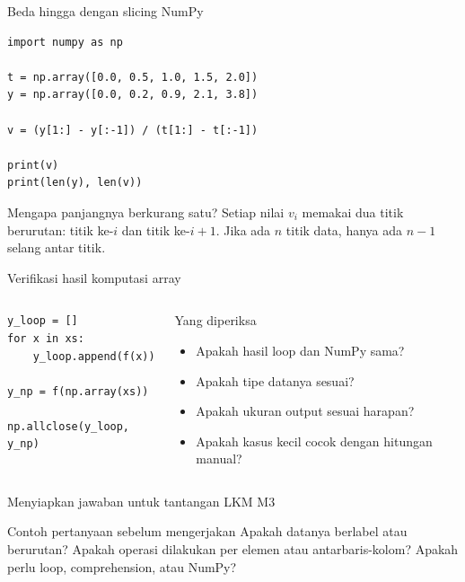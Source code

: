\documentclass[aspectratio=169,11pt]{beamer}
\begin{document}
\begin{frame}[fragile]{Beda hingga dengan slicing NumPy}
\begin{lstlisting}
import numpy as np

t = np.array([0.0, 0.5, 1.0, 1.5, 2.0])
y = np.array([0.0, 0.2, 0.9, 2.1, 3.8])

v = (y[1:] - y[:-1]) / (t[1:] - t[:-1])

print(v)
print(len(y), len(v))
\end{lstlisting}
\begin{block}{Mengapa panjangnya berkurang satu?}
Setiap nilai $v_i$ memakai dua titik berurutan: titik ke-$i$ dan titik ke-$i+1$. Jika ada $n$ titik data, hanya ada $n-1$ selang antar titik.
\end{block}
\end{frame}

\begin{frame}[fragile]{Verifikasi hasil komputasi array}
\begin{columns}[T]
\begin{lstlisting}
y_loop = []
for x in xs:
    y_loop.append(f(x))

y_np = f(np.array(xs))

np.allclose(y_loop, y_np)
\end{lstlisting}
\begin{block}{Yang diperiksa}
\begin{itemize}
  \item Apakah hasil loop dan NumPy sama?
  \item Apakah tipe datanya sesuai?
  \item Apakah ukuran output sesuai harapan?
  \item Apakah kasus kecil cocok dengan hitungan manual?
\end{itemize}
\end{block}
\end{columns}
\end{frame}

\begin{frame}{Menyiapkan jawaban untuk tantangan LKM M3}
\begin{center}
\end{center}
\vspace{2mm}
\begin{block}{Contoh pertanyaan sebelum mengerjakan}
Apakah datanya berlabel atau berurutan? Apakah operasi dilakukan per elemen atau antarbaris-kolom? Apakah perlu loop, comprehension, atau NumPy?
\end{block}
\end{frame}
\end{document}
